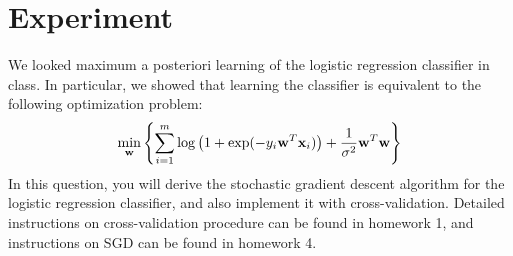 \section{Experiment}
\label{sec:experiment}

We looked maximum a posteriori learning of the logistic regression classifier in class. In particular, we showed that learning the classifier is equivalent to the following optimization problem:
\[
\min_{{\bf w}} \left\{\sum_{i=1}^m \log\left( 1+ \exp(-y_i{\bf w}^T{\bf x}_i)\right) + \frac{1}{\sigma^2}{\bf w}^T{\bf w}\right\}
\]
In this question, you will derive the stochastic gradient descent algorithm for the logistic
regression classifier, and also implement it with cross-validation. Detailed instructions on cross-validation procedure can be found in homework 1, and instructions on SGD can be found in homework 4.


